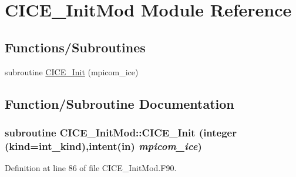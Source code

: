 \hypertarget{namespaceCICE__InitMod}{
\section{CICE\_\-InitMod Module Reference}
\label{namespaceCICE__InitMod}
}
\subsection*{Functions/Subroutines}
\begin{DoxyCompactItemize}
\item 
subroutine \hyperlink{namespaceCICE__InitMod_a51e5692821a3a0d09d140194fe266e8c}{CICE\_\-Init} (mpicom\_\-ice)
\end{DoxyCompactItemize}


\subsection{Function/Subroutine Documentation}
\hypertarget{namespaceCICE__InitMod_a51e5692821a3a0d09d140194fe266e8c}{
\subsubsection[{CICE\_\-Init}]{\setlength{\rightskip}{0pt plus 5cm}subroutine CICE\_\-InitMod::CICE\_\-Init (integer (kind=int\_\-kind),intent(in) {\em mpicom\_\-ice})}}
\label{namespaceCICE__InitMod_a51e5692821a3a0d09d140194fe266e8c}


Definition at line 86 of file CICE\_\-InitMod.F90.